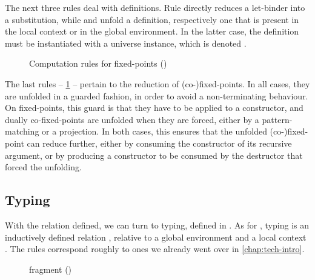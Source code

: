 The next three rules deal with definitions. Rule  directly reduces a
let-binder into a substitution, while  and  unfold a definition,
respectively one that is present in the local context or in the global environment. In the latter
case, the definition must be instantiated with a universe instance, which is denoted .

\begin{figure}[h]
  \ContinuedFloat
  \caption{Computation rules for fixed-points ()}
  \label{fig:meta-cumul-fix}
\end{figure}

The last rules – \cref{fig:meta-cumul-fix} – pertain to the reduction of (co-)fixed-points.
In all cases, they are unfolded in a guarded fashion, in order to avoid a non-terminating behaviour.
On fixed-points, this guard is that they have to be applied to a constructor,
and dually co-fixed-points are unfolded when
they are forced, either by a pattern-matching or a projection. In both cases, this ensures that
the unfolded (co-)fixed-point can reduce further, either by consuming the constructor of
its recursive argument, or by producing a constructor to be consumed by the destructor
that forced the unfolding.

\subsection{Typing}

With the  relation defined, we can turn to typing, defined in .
As for , typing is an inductively defined relation ,
relative to a global environment  and a local context .
The rules correspond roughly to ones we already went over in \cref{chap:tech-intro}.

\begin{figure}
  \ContinuedFloat*
  \caption{ fragment ()}
  \label{fig:meta-typing-ccw}
\end{figure}

